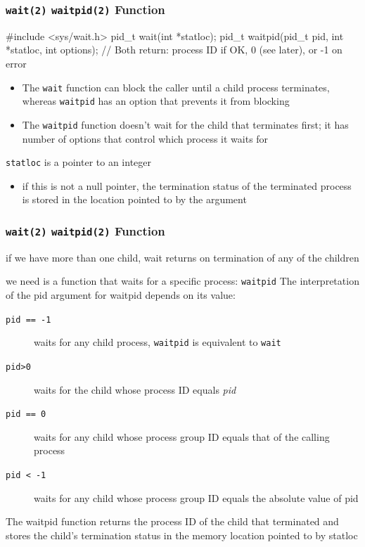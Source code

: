 \documentclass[newPxFont,sthlmFooter,nooffset]{beamer}
\begin{document}
\begin{frame}[containsverbatim,t]
  \frametitle{\texttt{wait(2)} \texttt{waitpid(2)} Function}

\begin{codedef}
#include <sys/wait.h>
pid_t wait(int *statloc);
pid_t waitpid(pid_t pid, int *statloc, int options);
// Both return: process ID if OK, 0 (see later), or -1 on error  
\end{codedef}

\begin{itemize}
\item The \texttt{wait} function can block the caller until a child process terminates, whereas \texttt{waitpid} has an option that prevents it from blocking
\item The \texttt{waitpid} function doesn't wait for the child that terminates first; it has number of options that control which process it waits for
\end{itemize}

\texttt{statloc} is a pointer to an integer
\begin{itemize}
\item if this is not a null pointer, the termination status of the terminated process is stored in the location pointed to by the argument
\end{itemize}
\end{frame}

\begin{frame}[containsverbatim,t]
  \frametitle{\texttt{wait(2)} \texttt{waitpid(2)} Function}  
if we have more than one child, wait returns on termination of any of the children

we need is a function that waits for a specific process: \texttt{waitpid}
The interpretation of the pid argument for waitpid depends on its value:
\begin{description}
\item [\texttt{pid == -1}] waits for any child process, \texttt{waitpid} is equivalent to \texttt{wait}
\item [\texttt{pid>0}] waits for the child whose process ID equals \textit{pid}
\item[\texttt{pid == 0}] waits for any child whose process group ID equals that of the calling process
\item[\texttt{pid < -1}] waits for any child whose process group ID equals the absolute value of pid
\end{description}

The waitpid function returns the process ID of the child that terminated and stores the child’s termination status in the memory location pointed to by statloc
\end{frame}
\end{document}
